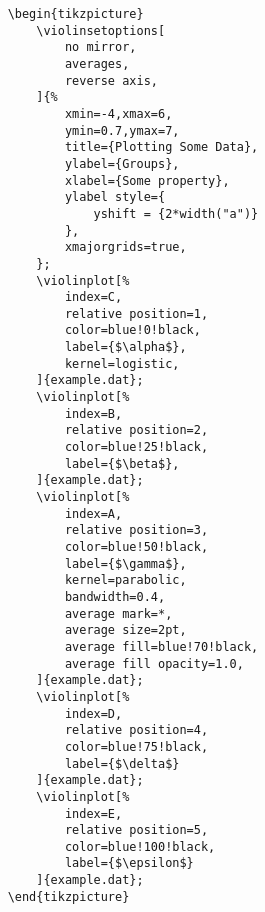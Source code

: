 \documentclass{article}
\begin{document}
\begin{verbatim}
	\begin{tikzpicture}
		\violinsetoptions[
			no mirror,
			averages,
			reverse axis,
		]{%
			xmin=-4,xmax=6,
			ymin=0.7,ymax=7,
			title={Plotting Some Data},
			ylabel={Groups},
			xlabel={Some property},
			ylabel style={
				yshift = {2*width("a")}
			},
			xmajorgrids=true,
		};
		\violinplot[%
			index=C,
			relative position=1,
			color=blue!0!black,
			label={$\alpha$},
			kernel=logistic,
		]{example.dat};
		\violinplot[%
			index=B,
			relative position=2,
			color=blue!25!black,
			label={$\beta$},
		]{example.dat};
		\violinplot[%
			index=A,
			relative position=3,
			color=blue!50!black,
			label={$\gamma$},
			kernel=parabolic,
			bandwidth=0.4,
			average mark=*,
			average size=2pt,
			average fill=blue!70!black,
			average fill opacity=1.0,
		]{example.dat};
		\violinplot[%
			index=D,
			relative position=4,
			color=blue!75!black,
			label={$\delta$}
		]{example.dat};
		\violinplot[%
			index=E,
			relative position=5,
			color=blue!100!black,
			label={$\epsilon$}
		]{example.dat};
	\end{tikzpicture}
\end{verbatim}
\end{document}
